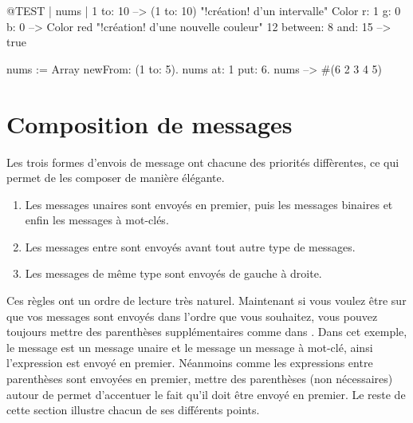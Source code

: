 \documentclass[a4paper,10pt,twoside]{book}
\begin{document}

\begin{code}{@TEST | nums |}
1 to: 10                        --> (1 to: 10)  "!cr\'eation! d'un intervalle"
Color r: 1 g: 0 b: 0       --> Color red  "!cr\'eation! d'une nouvelle couleur"
12 between: 8 and: 15 --> true

nums := Array newFrom: (1 to: 5).
nums at: 1 put: 6.
nums --> #(6 2 3 4 5)
\end{code}


\section{Composition de messages}
Les trois formes d'envois de message ont chacune des priorit\'es diff\`erentes, ce qui permet de les composer de mani\`ere \'el\'egante.

\begin{enumerate}
\item Les messages unaires sont envoy\'es en premier, puis les messages binaires et enfin les messages \`a mot-cl\'es.
\item Les messages entre  sont envoy\'es avant tout autre type de messages. 
\item Les messages de m\^eme type sont envoy\'es de gauche \`a droite. 
\end{enumerate}

Ces r\`egles ont un ordre de lecture tr\`es naturel. Maintenant si vous voulez \^etre sur que vos messages sont envoy\'es dans l'ordre que vous souhaitez, vous pouvez toujours mettre des parenth\`eses suppl\'ementaires comme dans . Dans cet exemple, le message  est un message unaire et le message un message \`a mot-cl\'e, ainsi l'expression  est envoy\'e en premier. N\'eanmoins comme les expressions entre parenth\`eses sont envoy\'ees en premier, mettre des parenth\`eses (non n\'ecessaires) autour de  permet d'accentuer le fait qu'il doit \^etre envoy\'e en premier. Le reste de cette section illustre chacun de ses diff\'erents points.
\end{document}
